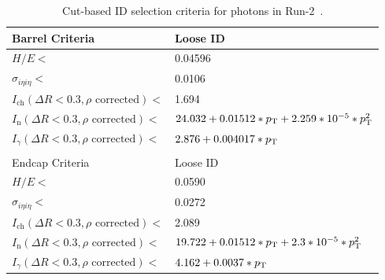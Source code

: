 \begin{table}[htb!]
	\centering
	\caption[Cut-based ID selection criteria for photons in Run-2.]{Cut-based ID selection criteria for photons in Run-2~\cite{photonid}.}
	\label{tab:photonID}
	\begin{tabular}{l | l}
		\hline
		Barrel Criteria & Loose ID \\
		\hline
		\hline
		$H/E<$ & 0.04596\\
		$\sigma_{i\eta i\eta}<$ & 0.0106\\
		$I_\text{ch}(\Delta R<0.3,\rho\text{ corrected})<$ & 1.694\\
		$I_\text{n}(\Delta R<0.3,\rho\text{ corrected})<$ & $24.032+0.01512*p_{\mathrm{T}}+2.259*10^{-5}*p_{\mathrm{T}}^2$\\
		$I_\gamma(\Delta R<0.3,\rho\text{ corrected})<$ & $2.876+0.004017*p_{\mathrm{T}}$\\
		\hline
		\multicolumn{2}{l}{}\\
		\hline
		Endcap Criteria & Loose ID \\
		\hline
		\hline
		$H/E<$ & 0.0590\\
		$\sigma_{i\eta i\eta}<$ & 0.0272\\
		$I_\text{ch}(\Delta R<0.3,\rho\text{ corrected})<$ & 2.089\\
		$I_\text{n}(\Delta R<0.3,\rho\text{ corrected})<$ & $19.722+0.01512*p_{\mathrm{T}}+2.3*10^{-5}*p_{\mathrm{T}}^2$\\
		$I_\gamma(\Delta R<0.3,\rho\text{ corrected})<$ & $4.162+0.0037*p_{\mathrm{T}}$\\
		\hline
	\end{tabular}
\end{table}

